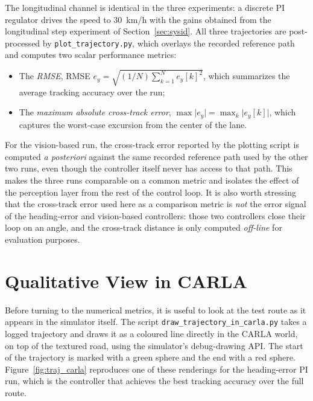 The longitudinal channel is identical in the three experiments: a discrete PI regulator drives the speed to $30$~km/h with the gains obtained from the longitudinal step experiment of Section~\ref{sec:sysid}. All three trajectories are post-processed by \texttt{plot\_trajectory.py}, which overlays the recorded reference path and computes two scalar performance metrics:

\begin{itemize}
    \item The \emph{\acl{RMSE}}, \ac{RMSE} $e_y = \sqrt{(1/N) \sum_{k=1}^N e_y[k]^2}$, which summarizes the average tracking accuracy over the run;
    \item The \emph{maximum absolute cross-track error}, $\max \lvert e_y \rvert = \max_{k} \lvert e_y[k] \rvert$, which captures the worst-case excursion from the center of the lane.
\end{itemize}

For the vision-based run, the cross-track error reported by the plotting script is computed \emph{a posteriori} against the same recorded reference path used by the other two runs, even though the controller itself never has access to that path. This makes the three runs comparable on a common metric and isolates the effect of the perception layer from the rest of the control loop. It is also worth stressing that the cross-track error used here as a comparison metric is \emph{not} the error signal of the heading-error and vision-based controllers: those two controllers close their loop on an angle, and the cross-track distance is only computed \emph{off-line} for evaluation purposes.

\section{Qualitative View in CARLA}
\label{sec:carla_view}
Before turning to the numerical metrics, it is useful to look at the test route as it appears in the simulator itself. The script \texttt{draw\_trajectory\_in\_carla.py} takes a logged trajectory and draws it as a coloured line directly in the CARLA world, on top of the textured road, using the simulator's debug-drawing API. The start of the trajectory is marked with a green sphere and the end with a red sphere. Figure~\ref{fig:traj_carla} reproduces one of these renderings for the heading-error PI run, which is the controller that achieves the best tracking accuracy over the full route.


